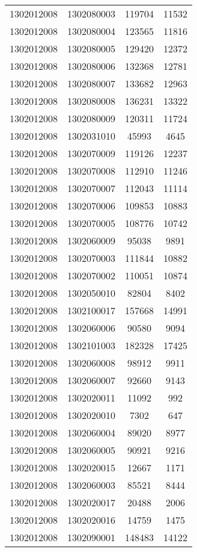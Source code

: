 \begin{longtable}[h]{llcc}
		1302012008 & 1302080003 & 119704 & 11532\\
		1302012008 & 1302080004 & 123565 & 11816\\
		1302012008 & 1302080005 & 129420 & 12372\\
		1302012008 & 1302080006 & 132368 & 12781\\
		1302012008 & 1302080007 & 133682 & 12963\\
		1302012008 & 1302080008 & 136231 & 13322\\
		1302012008 & 1302080009 & 120311 & 11724\\
		1302012008 & 1302031010 & 45993 & 4645\\
		1302012008 & 1302070009 & 119126 & 12237\\
		1302012008 & 1302070008 & 112910 & 11246\\
		1302012008 & 1302070007 & 112043 & 11114\\
		1302012008 & 1302070006 & 109853 & 10883\\
		1302012008 & 1302070005 & 108776 & 10742\\
		1302012008 & 1302060009 & 95038 & 9891\\
		1302012008 & 1302070003 & 111844 & 10882\\
		1302012008 & 1302070002 & 110051 & 10874\\
		1302012008 & 1302050010 & 82804 & 8402\\
		1302012008 & 1302100017 & 157668 & 14991\\
		1302012008 & 1302060006 & 90580 & 9094\\
		1302012008 & 1302101003 & 182328 & 17425\\
		1302012008 & 1302060008 & 98912 & 9911\\
		1302012008 & 1302060007 & 92660 & 9143\\
		1302012008 & 1302020011 & 11092 & 992\\
		1302012008 & 1302020010 & 7302 & 647\\
		1302012008 & 1302060004 & 89020 & 8977\\
		1302012008 & 1302060005 & 90921 & 9216\\
		1302012008 & 1302020015 & 12667 & 1171\\
		1302012008 & 1302060003 & 85521 & 8444\\
		1302012008 & 1302020017 & 20488 & 2006\\
		1302012008 & 1302020016 & 14759 & 1475\\
		1302012008 & 1302090001 & 148483 & 14122\\

\end{longtable}
